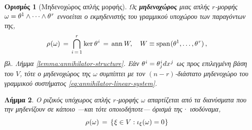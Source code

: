 \documentclass[11pt,a4paper,twoside,openright]{book}
\newtheorem{lemma}{Λήμμα}[section]
\newtheorem{definition}[lemma]{Ορισμός}
\begin{document}
\begin{definition}[Μηδενοχώρος απλής μορφής]
	\label{def:nullspace-simple-form}
Ως \textbf{μηδενοχώρος} μιας απλής $r$-μορφής $\omega = \theta^1 \wedge \dots \wedge \theta^{\hspace{.5pt}r}$ εννοείται ο εκμηδενιστής του γραμμικού υποχώρου των παραγόντων της,
\begin{equation}\label{eq:nullspace-simple-form}
\begin{split}
\rho\hspace{.5pt}(\omega)
\,=\,
\bigcap_{i\,=\,1}^r
\hspace{.5pt}\operatorname{ker}\hspace{.5pt}\theta^{\hspace{.5pt}i}
\,=\,
\operatorname{ann}\hspace{.5pt}W,
\quad
W \equiv \operatorname{span}\hspace{.5pt}
(\theta^1, \dots, \theta^{\hspace{.5pt}r})\,,
\end{split}
\end{equation}
βλ. Λήμμα \ref{lemma:annihilator-structure}. Εάν
$\theta^{\hspace{.5pt}i} = \theta^{\hspace{.5pt}i}_j \hspace{.5pt}dx^{\hspace{.5pt}j}$ ως προς επιλεγμένη βάση του $V$, τότε ο
μηδενοχώρος της $\omega$
συμπίπτει με τον $(n-r)$-διάστατο
μηδενοχώρο του γραμμικού συστήματος \eqref{eq:annihilator-linear-system}.
\end{definition}
\begin{lemma}%
	\label{lemma:radix-space-characterization}
Ο ριζικός υπόχωρος απλής $r$-μορφής $\omega$
απαρτίζεται από τα διανύσματα που την μηδενίζουν σε κάποιο ---και τότε οποιοδήποτε--- όρισμά της· ισοδύναμα,
\begin{equation}\label{eq:radix-space-characterization}
\rho\hspace{.5pt}(\omega)
\,=\,
\{\hspace{.5pt}\xi \in V: \iota_\xi (\omega) = 0\hspace{.5pt}\}
\end{equation}
\end{lemma}
\end{document}
